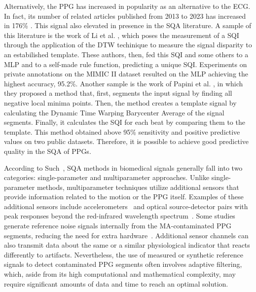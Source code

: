 Alternatively, the \gls{PPG} has increased in popularity as an alternative to the \gls{ECG}. In fact, its number of related articles published from 2013 to 2023 has increased in 176\% \cite{ppg-1}. This signal also elevated in presence in the \gls{SQA} literature. A sample of this literature is the work of Li et al. \cite{ppg-2}, which poses the measurement of a \gls{SQI} through the application of the \gls{DTW} techinique to measure the signal disparity to an estabilished template. These authors, then, fed this \gls{SQI} and some others to a \gls{MLP} and to a self-made rule function, predicting a unique \gls{SQI}. Experiments on private annotations on the MIMIC II dataset resulted on the \gls{MLP} achieving the highest accuracy, 95.2\%. Another sample is the work of Papini et al. \cite{ppg-3}, in which they proposed a method that, first, segments the input signal by finding all negative local minima points. Then, the method creates a template signal by calculating the Dynamic Time Warping Barycenter Average of the signal segments. Finally, it calculates the \gls{SQI} for each beat by comparing them to the template. This method obtained above 95\% sensitivity and positive predictive values on two public datasets. Therefore, it is possible to achieve good predictive quality in the \gls{SQA} of \glspl{PPG}.


According to Such~\cite{such2007motion}, \gls{SQA} methods in biomedical signals generally fall into two categories: single-parameter and multiparameter approaches. Unlike single-parameter methods, multiparameter techniques utilize additional sensors that provide information related to the motion or the \gls{PPG} itself. Examples of these additional sensors include accelerometers~\cite{nabavi2020robust, tuauctan2015characterization} and optical source-detector pairs with peak responses beyond the red-infrared wavelength spectrum~\cite{zhang2019motion}. Some studies generate reference noise signals internally from the MA-contaminated PPG segments, reducing the need for extra hardware~\cite{ram2011novel, raghuram2016use}. Additional sensor channels can also transmit data about the same or a similar physiological indicator that reacts differently to artifacts. Nevertheless, the use of measured or synthetic reference signals to detect contaminated \gls{PPG} segments often involves adaptive filtering, which, aside from its high computational and mathematical complexity, may require significant amounts of data and time to reach an optimal solution.


		
